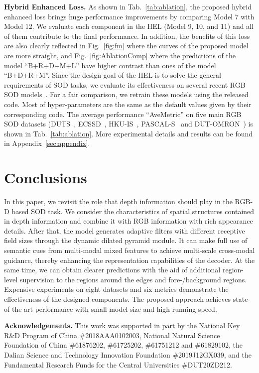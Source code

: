 \documentclass[runningheads]{llncs}
\begin{document}
\noindent\textbf{Hybrid Enhanced Loss.}
As shown in Tab.~\ref{tab:ablation}, the proposed hybrid enhanced loss brings huge performance improvements by comparing Model 7 with Model 12.
We evaluate each component in the HEL (Model 9, 10, and 11) and all of them contribute to the final performance.
In addition, the benefits of this loss are also clearly reflected in Fig.~\ref{fig:fm} where the curves of the proposed model are more straight, and Fig.~\ref{fig:AblationComp} where the predictions of the model ``B+R+D+M+L'' have higher contrast than ones of the model ``B+D+R+M''. Since the design goal of the HEL is to solve the general requirements of SOD tasks, we evaluate its effectiveness on several recent RGB SOD models~\cite{R3Net,CPD,PoolNet,GCPANet}. For a fair comparison, we retrain these models using the released code. Most of hyper-parameters are the same as the default values given by their corresponding code. The average performance ``AveMetric'' on five main RGB SOD datasets (DUTS~\cite{DUTS}, ECSSD~\cite{ECSSD}, HKU-IS~\cite{HKU-IS}, PASCAL-S~\cite{PASCAL-S} and DUT-OMRON~\cite{DUT-OMRON}) is shown in Tab.~\ref{tab:ablation}. More experimental details and results can be found in Appendix~\ref{sec:appendix}.

\section{Conclusions}

In this paper, we revisit the role that depth information should play in the RGB-D based SOD task.
We consider the characteristics of spatial structures contained in depth information and combine it with RGB information with rich appearance details. After that, the model generates adaptive filters with different receptive field sizes through the dynamic dilated pyramid module.
It can make full use of semantic cues from multi-modal mixed features to achieve multi-scale cross-modal guidance, thereby enhancing the representation capabilities of the decoder.
At the same time, we can obtain clearer predictions with the aid of additional region-level supervision to the regions around the edges and fore-/background regions.
Expensive experiments on eight datasets and six metrics demonstrate the effectiveness of the designed components. The proposed approach achieves state-of-the-art performance with small model size and high running speed.

\noindent\textbf{Acknowledgements.} This work was supported in part by the National Key R\&D Program of China \#2018AAA0102003, National Natural Science Foundation of China \#61876202, \#61725202, \#61751212 and \#61829102, the Dalian Science and Technology Innovation Foundation \#2019J12GX039, and the Fundamental Research Funds for the Central Universities \#DUT20ZD212.
\end{document}
